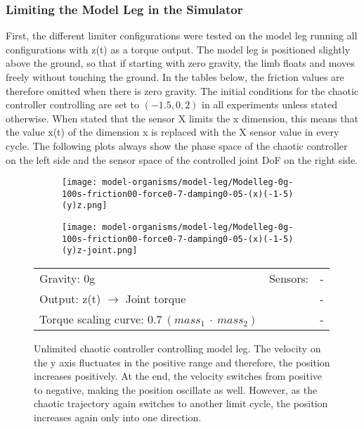 \documentclass[main]{subfiles}
\begin{document}
\subsubsection{Limiting the Model Leg in the Simulator}
\label{subsubsec:limiting-the-model-leg}

First, the different limiter configurations were tested on the model leg running all configurations with z(t) as a torque output. %
%
The model leg is positioned slightly above the ground, so that if starting with zero gravity, the limb floats and moves freely without touching the ground. %
%
In the tables below, the friction values are therefore omitted when there is zero gravity. %
%
The initial conditions for the chaotic controller controlling are set to \((-1.5,0,2)\) in all experiments unless stated otherwise. %
%
When stated that the sensor X limits the x dimension, this means that the value x(t) of the dimension x is replaced with the X sensor value in every cycle. %
%
The following plots always show the phase space of the chaotic controller on the left side and the sensor space of the controlled joint DoF on the right side.

\begin{figure}[H]
	\centering
	\begin{subfigure}[c]{0.45\textwidth}
	\texttt{[image: model-organisms/model-leg/Modelleg-0g-100s-friction00-force0-7-damping0-05-(x)(-1-5)(y)z.png]}
	\end{subfigure}
	\begin{subfigure}[c]{0.45\textwidth}
	\texttt{[image: model-organisms/model-leg/Modelleg-0g-100s-friction00-force0-7-damping0-05-(x)(-1-5)(y)z-joint.png]}
	\end{subfigure}
	\caption[Unlimited chaotic controller controlling model leg.]{Unlimited chaotic controller controlling model leg. The velocity on the y axis fluctuates in the positive range and therefore, the position increases positively. At the end, the velocity switches from positive to negative, making the position oscillate as well. However, as the chaotic trajectory again switches to another limit cycle, the position increases again only into one direction.}
	\begin{tabular}{l|ll}
	\hline 
	Gravity: 0g  & Sensors: & - \\
	 Output: z(t) \(\rightarrow\) Joint torque & & - \\
	  Torque scaling curve: \(0.7~(mass_1~\cdot~mass_2)\) & & - \\
	  \hline
	\end{tabular}

	\label{figure:unlimited-model-leg}
\end{figure}
\end{document}
